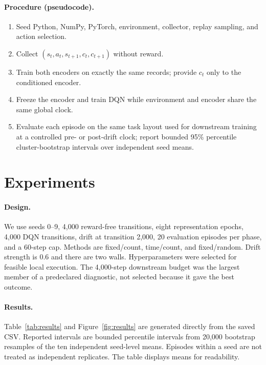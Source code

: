 \documentclass[10pt]{article}
\begin{document}
\paragraph{Procedure (pseudocode).}
\begin{enumerate}
  \item Seed Python, NumPy, PyTorch, environment, collector, replay sampling,
  and action selection.
  \item Collect $(s_t,a_t,s_{t+1},c_t,c_{t+1})$ without reward.
  \item Train both encoders on exactly the same records; provide $c_t$ only to
  the conditioned encoder.
  \item Freeze the encoder and train DQN while environment and encoder share
  the same global clock.
  \item Evaluate each episode on the same task layout used for downstream
  training at a controlled pre- or post-drift clock; report bounded 95\%
  percentile cluster-bootstrap intervals over independent seed means.
\end{enumerate}

\section{Experiments}
\paragraph{Design.}
We use seeds 0--9, 4,000 reward-free transitions, eight representation epochs,
4,000 DQN transitions, drift at transition 2,000, 20 evaluation episodes per
phase, and a 60-step cap.  Methods are fixed/count, time/count, and
fixed/random.  Drift strength is 0.6 and there are two walls.  Hyperparameters
were selected for feasible local execution.  The 4,000-step downstream budget
was the largest member of a predeclared diagnostic, not selected because it
gave the best outcome.

\paragraph{Results.}
Table~\ref{tab:results} and Figure~\ref{fig:results} are generated directly
from the saved CSV.  Reported intervals are bounded percentile intervals from
20,000 bootstrap resamples of the ten independent seed-level means.  Episodes
within a seed are not treated as independent replicates.  The table displays
means for readability.

\begin{table}[t]
\centering
\caption{Mean success rate across ten seeds.}
\label{tab:results}

\end{table}
\end{document}
